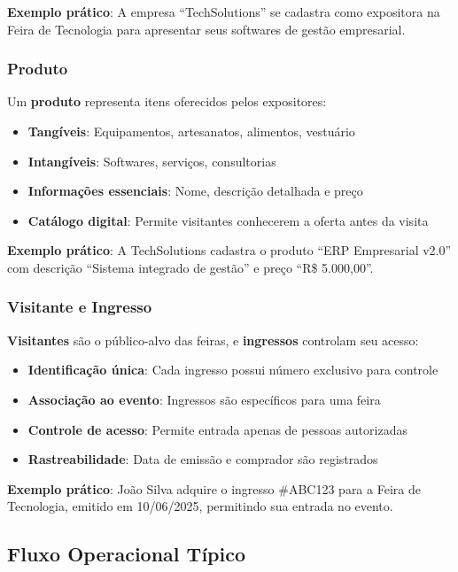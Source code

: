 \documentclass[12pt,a4paper]{article}
\begin{document}
\textbf{Exemplo prático}: A empresa ``TechSolutions'' se cadastra como expositora na Feira de Tecnologia para apresentar seus softwares de gestão empresarial.

\subsubsection{Produto}
Um \textbf{produto} representa itens oferecidos pelos expositores:
\begin{itemize}
    \item \textbf{Tangíveis}: Equipamentos, artesanatos, alimentos, vestuário
    \item \textbf{Intangíveis}: Softwares, serviços, consultorias
    \item \textbf{Informações essenciais}: Nome, descrição detalhada e preço
    \item \textbf{Catálogo digital}: Permite visitantes conhecerem a oferta antes da visita
\end{itemize}

\textbf{Exemplo prático}: A TechSolutions cadastra o produto ``ERP Empresarial v2.0'' com descrição ``Sistema integrado de gestão'' e preço ``R\$ 5.000,00''.

\subsubsection{Visitante e Ingresso}
\textbf{Visitantes} são o público-alvo das feiras, e \textbf{ingressos} controlam seu acesso:
\begin{itemize}
    \item \textbf{Identificação única}: Cada ingresso possui número exclusivo para controle
    \item \textbf{Associação ao evento}: Ingressos são específicos para uma feira
    \item \textbf{Controle de acesso}: Permite entrada apenas de pessoas autorizadas
    \item \textbf{Rastreabilidade}: Data de emissão e comprador são registrados
\end{itemize}

\textbf{Exemplo prático}: João Silva adquire o ingresso \#ABC123 para a Feira de Tecnologia, emitido em 10/06/2025, permitindo sua entrada no evento.

\subsection{Fluxo Operacional Típico}
\end{document}
